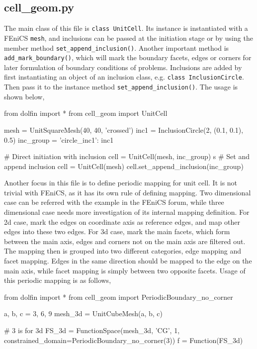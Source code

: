 \documentclass[10pt,a4paper]{scrreprt}
\begin{document}
\subsection{cell\_geom.py}
The main class of this file is \texttt{class UnitCell}. Its instance is instantiated with a FEniCS \texttt{mesh}, and inclusions can be passed at the initiation stage or by using the member method \texttt{set\_append\_inclusion()}. Another important method is \texttt{add\_mark\_boundary()}, which will mark the boundary facets, edges or corners for later formulation of boundary conditions of problems. Inclusions are added by first instantiating an object of an inclusion class, e.g. \texttt{class InclusionCircle}. Then pass it to the instance method \texttt{set\_append\_inclusion()}. The usage is shown below,

\begin{python}
from dolfin import *
from cell_geom import UnitCell

mesh = UnitSquareMesh(40, 40, 'crossed')
inc1 = InclusionCircle(2, (0.1, 0.1), 0.5)
inc_group = {'circle_inc1': inc1}

# Direct initiation with inclusion
cell = UnitCell(mesh, inc_group)
s
# Set and append inclusion
cell = UnitCell(mesh)
cell.set_append_inclusion(inc_group)
\end{python}

Another focus in this file is to define periodic mapping for unit cell. It is not trivial with FEniCS, as it has its own rule of defining mapping. Two dimensional case can be referred with the example in the FEniCS forum, while three dimensional case needs more investigation of its internal mapping definition. For 2d case, mark the edges on coordinate axis as reference edges, and map other edges into these two edges. For 3d case, mark the main facets, which form between the main axis, edges and corners not on the main axis are filtered out. The mapping then is grouped into two different categories, edge mapping and facet mapping. Edges in the same direction should be mapped to the edge on the main axis, while facet mapping is simply between two opposite facets. Usage of this periodic mapping is as follows,

\begin{python}
from dolfin import *
from cell_geom import PeriodicBoundary_no_corner

a, b, c = 3, 6, 9
mesh_3d = UnitCubeMesh(a, b, c)

# 3 is for 3d
FS_3d = FunctionSpace(mesh_3d, 'CG', 1, constrained_domain=PeriodicBoundary_no_corner(3))
f = Function(FS_3d)
\end{python}
\end{document}
